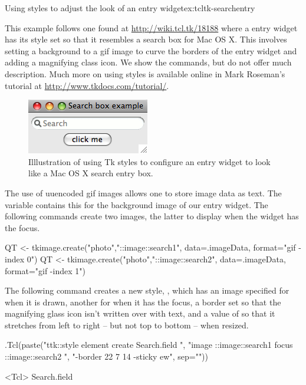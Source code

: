 \begin{example}{Using styles to adjust the look of an entry widget}{ex:tcltk-searchentry}

This example follows one found at \url{http://wiki.tcl.tk/18188} where
a entry widget has its style set so that it resembles a search box for
Mac OS X. This involves setting a background to a gif image to curve
the borders of the entry widget and adding a magnifying class icon. We
show the commands, but do not offer much description. Much more on
using styles is available online in Mark Roseman's \Tk\/ tutorial at
\url{http://www.tkdocs.com/tutorial/}.


\begin{figure}
  \centering
  \includegraphics[width=.4\textwidth]{fig-tcltk-searchentry.png}
  \caption{Illlustration of using Tk styles to configure an entry widget to look like a Mac OS X search entry box.}
  \label{fig:fig-tcltk-searchentry}
\end{figure}


The use of uuencoded gif images allows one to store image data as
text. The variable  contains this for the background
image of our entry widget. The following commands create two images,
the latter to display when the widget has the focus.
\begin{Schunk}
\begin{Sinput}
 QT <- tkimage.create("photo","::image::search1", 
                      data=.imageData, format="gif -index 0")
 QT <- tkimage.create("photo","::image::search2", 
                      data=.imageData, format="gif -index 1")
\end{Sinput}
\end{Schunk}

The following command creates a new style, , which has an image specified for when it is drawn, another for when it has the focus, a border set so that the magnifying glass icon isn't written over with text, and a value of  so that it stretches from left to right -- but not top to bottom -- when resized.
\begin{Schunk}
\begin{Sinput}
 .Tcl(paste("ttk::style element create Search.field ",
            "image {::image::search1 focus ::image::search2} ",
            "-border {22 7 14} -sticky ew",
            sep=""))
\end{Sinput}
\begin{Soutput}
<Tcl> Search.field 
\end{Soutput}
\end{Schunk}


\end{example}
